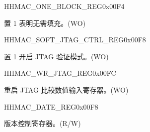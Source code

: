 \begin{register}{H}{HMAC\_ONE\_BLOCK\_REG}{0x00F4}\label{regdesc:HMACONEBLOCKREG}
%
%
\regnewline%
\begin{regdesc}\begin{reglist}
\label{fielddesc:HMACSETONEBLOCK}\item [HMAC\_SET\_ONE\_BLOCK] 置 1 表明无需填充。(WO)
\end{reglist}\end{regdesc}
\end{register}


\begin{register}{H}{HMAC\_SOFT\_JTAG\_CTRL\_REG}{0x00F8}\label{regdesc:HMACSOFTJTAGCTRLREG}
%
%
\regnewline%
\begin{regdesc}\begin{reglist}
\label{fielddesc:HMACSOFTJTAGCTRL}\item [HMAC\_SOFT\_JTAG\_CTRL] 置 1 开启 JTAG 验证模式。(WO)
\end{reglist}\end{regdesc}
\end{register}


\begin{register}{H}{HMAC\_WR\_JTAG\_REG}{0x00FC}\label{regdesc:HMACWRJTAGREG}
%
\regnewline%
\begin{regdesc}\begin{reglist}
\label{fielddesc:HMACWRJTAG}\item [HMAC\_WR\_JTAG] 重启 JTAG 比较数值输入寄存器。(WO)
\end{reglist}\end{regdesc}
\end{register}



\begin{register}{H}{HMAC\_DATE\_REG}{0x00F8}\label{regdesc:HMACDATEREG}
%
%
\regnewline%
\begin{regdesc}\begin{reglist}
\label{fielddesc:HMACDATE}\item [HMAC\_DATE] 版本控制寄存器。(R/W)
\end{reglist}\end{regdesc}
\end{register}
